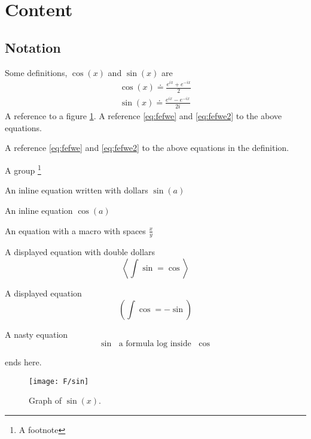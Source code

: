 \section{Content}

\subsection{Notation}

\begin{Defn}
  \label{defn:1}
  Some definitions, $\cos(x)$ and \(\sin(x)\) are
  \begin{eqnarray}
    \cos(x) \doteq \frac{e^{ix}+e^{-ix}}{2}  \label{eq:fefwe} \\
    \sin(x) \doteq \frac{e^{ix}-e^{-ix}}{2i} \label{eq:fefwe2}
  \end{eqnarray}
  A reference to a figure \ref{fig:a354}.
  A reference \eqref{eq:fefwe} and  \eqref{eq:fefwe2} to the above equations.
\end{Defn}


A reference \eqref{eq:fefwe} and  \eqref{eq:fefwe2} to the above equations
in the definition.

A group
\footnote{A footnote}
\bgroup\em

An inline equation written with dollars $\sin(a)$

An inline equation  \(\cos(a)\)

An equation with a macro with spaces
\(\frac x y\)

A displayed equation with double dollars
$$ \left<\int\sin = \cos \right>$$

A displayed equation
\[ \left(\int\cos = -\sin\right)\]

A nasty equation
$$ \sin \text{ a formula $\log$ inside } \cos $$

\egroup
ends here.

\begin{figure}[ht]\label{fig:a354}
  \begin{center}
    \texttt{[image: F/sin]}
    \caption{Graph of \(\sin(x)\).}
  \end{center}
\end{figure}


\lipsum[2]


